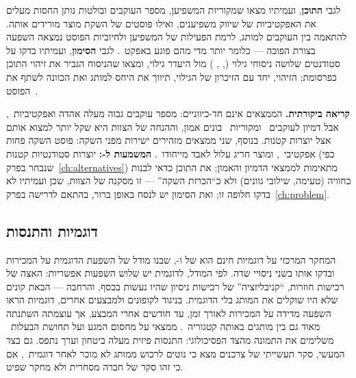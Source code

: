 לגבי \textbf{התוכן},  ועמיתיו מצאו שמקוריות המשפיען, מספר העוקבים
ובולטות נותן החסות מעלים את האפקטיביות של שיווק משפיענים, ואילו פוסטים של
השקת מוצר מורידים אותה. להתאמה בין העוקבים למותג, לרמת הפעילות של המשפיען
ולחיוביות הפוסט נמצאה השפעה בצורת  הפוכה --- כלומר יותר מדי מהם פוגע
באפקט~\cite{leung2022influencer}. לגבי \textbf{הסימון},  ועמיתיו בדקו
על  סטודנטים שלושה ניסוחי גילוי (, , )
מול היעדר גילוי, ומצאו שהניסוח  הגביר את זיהוי התוכן כפרסומת;
הזיהוי, יחד עם הזיכרון של הגילוי, תיווך את היחס למותג ואת הכוונה לשתף את
הפוסט~\cite{evans2017disclosing}.

\textbf{קריאה ביקורתית.} הממצאים אינם חד-כיווניים: מספר עוקבים גבוה מעלה אהדה
ואפקטיביות~\cite{deveirman2017marketing,leung2022influencer}, אבל דמיון
לעוקבים~\cite{lou2019influencer} ומקוריות~\cite{leung2022influencer} בונים אמון,
וההנחה של הצוות היא שקל יותר למצוא אותם אצל יוצרות קטנות. בנוסף, שני ממצאים מזהירים ישירות מפני
השקה: פוסט השקה פחות אפקטיבי~\cite{leung2022influencer}, ומוצר חריג עלול לאבד
מייחודו~\cite{deveirman2017marketing}. \textbf{המשמעות ל-:} יוצרות
סטודנטיות קטנות (כפי שנבחר בפרק~\ref{ch:alternatives}) מתאימות לממצאי הדמיון
והאמון; את התוכן כדאי לבנות כחוויה (טעימה, שילובי גוונים) ולא כ``הכרזת השקה''
--- זו מסקנה של הצוות, שכן  ועמיתיו לא בדקו חלופה זו;
ואת הסימון יש לנסח באופן ברור, בהתאם לדרישה  בפרק~\ref{ch:problem}.

\subsection{דוגמיות והתנסות}
\label{subsec:lit-sampling}

המחקר המרכזי על דוגמיות חינם הוא של  ו-, שבנו מודל של
השפעת הדוגמית על המכירות ובדקו אותו בשני ניסויי שדה. לפי המודל, לדוגמית יש
שלוש השפעות אפשריות: האצה של רכישות חוזרות, ``קניבליזציה'' של רכישות ניסיון
שהיו נעשות בכסף, והרחבה --- הבאת קונים שלא היו שוקלים את המותג בלי הדוגמית.
בניגוד לקופונים ולמבצעים אחרים, דוגמיות הראו השפעה מדידה על המכירות לאורך זמן,
עד  חודשים אחרי המבצע, אך עוצמתה השתנתה מאוד גם בין מותגים באותה
קטגוריה~\cite{bawa2004effects}. ממצאי  על מחסום המגע ועל תחושת
הבעלות~\cite{peck2003have,peck2009effect} משלימים את התמונה מהצד הפסיכולוגי:
התנסות פיזית מעלה ביטחון וערך נתפס. גם בצד המעשי, סקר תעשייתי של 
צרכנים מצא כי  נוטים לרכוש ממותג לא מוכר לאחר
דוגמית~\cite{cosmeticsbusiness2021sampling}, אם כי זהו סקר של חברה מסחרית ולא
מחקר שפיט.

